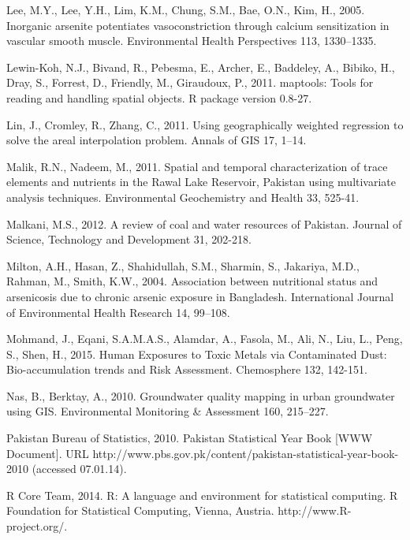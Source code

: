 \begin{thebibliography}
\bibitem{} \hangindent=1cm Lee, M.Y., Lee, Y.H., Lim, K.M., Chung, S.M., Bae, O.N., Kim, H., 2005. Inorganic arsenite potentiates vasoconstriction through calcium sensitization in vascular smooth muscle. Environmental Health Perspectives 113, 1330–1335.

\bibitem{} \hangindent=1cm Lewin-Koh, N.J., Bivand, R., Pebesma, E., Archer, E., Baddeley, A., Bibiko, H., Dray, S., Forrest, D., Friendly, M., Giraudoux, P., 2011. maptools: Tools for reading and handling spatial objects. R package version 0.8-27.

\bibitem{} \hangindent=1cm Lin, J., Cromley, R., Zhang, C., 2011. Using geographically weighted regression to solve the areal interpolation problem. Annals of GIS 17, 1–14.

\bibitem{} \hangindent=1cm Malik, R.N., Nadeem, M., 2011. Spatial and temporal characterization of trace elements and nutrients in the Rawal Lake Reservoir, Pakistan using multivariate analysis techniques. Environmental Geochemistry and Health 33, 525-41.

\bibitem{} \hangindent=1cm Malkani, M.S., 2012. A review of coal and water resources of Pakistan. Journal of Science, Technology and Development 31, 202-218.

\bibitem{} \hangindent=1cm Milton, A.H., Hasan, Z., Shahidullah, S.M., Sharmin, S., Jakariya, M.D., Rahman, M., Smith, K.W., 2004. Association between nutritional status and arsenicosis due to chronic arsenic exposure in Bangladesh. International Journal of Environmental Health Research 14, 99–108.

\bibitem{} \hangindent=1cm Mohmand, J., Eqani, S.A.M.A.S., Alamdar, A., Fasola, M., Ali, N., Liu, L., Peng, S., Shen, H., 2015. Human Exposures to Toxic Metals via Contaminated Dust: Bio-accumulation trends and Risk Assessment. Chemosphere 132, 142-151.

\bibitem{} \hangindent=1cm Nas, B., Berktay, A., 2010. Groundwater quality mapping in urban groundwater using GIS. Environmental Monitoring \& Assessment 160, 215–227.

\bibitem{} \hangindent=1cm Pakistan Bureau of Statistics, 2010. Pakistan Statistical Year Book [WWW Document]. URL http://www.pbs.gov.pk/content/pakistan-statistical-year-book-2010 (accessed 07.01.14).

\bibitem{} \hangindent=1cm R Core Team, 2014. R: A language and environment for statistical computing. R Foundation for Statistical Computing, Vienna, Austria. http://www.R-project.org/.


\end{thebibliography}
